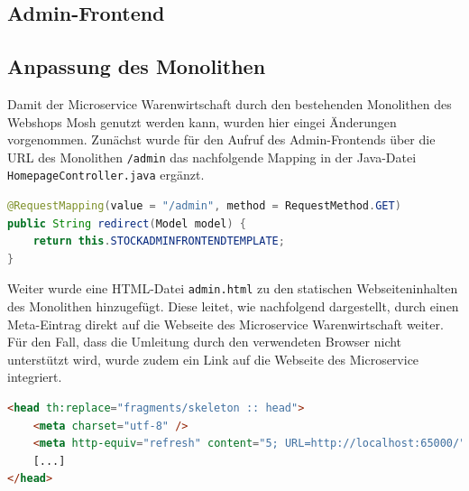 \subsection{Admin-Frontend}
\label{subsec: Admin-Frontend}


\newpage
\subsection{Anpassung des Monolithen}
\label{subsec: Anpassung des Monolithen}
Damit der Microservice Warenwirtschaft durch den bestehenden Monolithen des Webshops Mosh genutzt werden kann, wurden hier eingei Änderungen vorgenommen. Zunächst wurde für den Aufruf des Admin-Frontends über die URL des Monolithen \texttt{/admin} das nachfolgende Mapping in der Java-Datei \texttt{HomepageController.java} ergänzt.

\begin{lstlisting}[caption=Datenabfrage von der Bestellung (Waren wurden bestellt), language=Java]
@RequestMapping(value = "/admin", method = RequestMethod.GET)
public String redirect(Model model) {
	return this.STOCKADMINFRONTENDTEMPLATE;
}
\end{lstlisting}

Weiter wurde eine HTML-Datei \texttt{admin.html} zu den statischen Webseiteninhalten des Monolithen hinzugefügt. Diese leitet, wie nachfolgend dargestellt, durch einen Meta-Eintrag direkt auf die Webseite des Microservice Warenwirtschaft weiter. Für den Fall, dass die Umleitung durch den verwendeten Browser nicht unterstützt wird, wurde zudem ein Link auf die Webseite des Microservice integriert.

\begin{lstlisting}[caption=Datenabfrage von der Bestellung (Waren wurden bestellt), language=HTML]
<head th:replace="fragments/skeleton :: head">
	<meta charset="utf-8" />
    <meta http-equiv="refresh" content="5; URL=http://localhost:65000/"/>
    [...]
</head>
\end{lstlisting}





